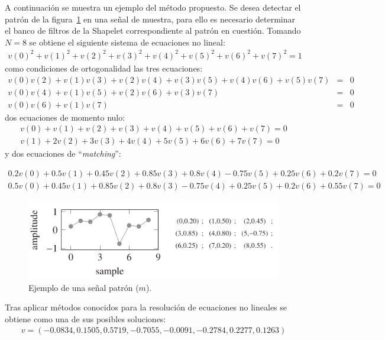 \par A continuaci\'on se muestra un ejemplo del m\'etodo propuesto. Se desea detectar el patr\'on de la figura~\ref{patron-unidimensional} en una se\~nal de muestra, para ello es necesario determinar el banco de filtros de la Shapelet correspondiente al patr\'on en cuesti\'on. Tomando $N=8$ se obtiene el siguiente sistema de ecuaciones no lineal:
\begin{eqnarray}
v(0)^2+v(1)^2+v(2)^2+v(3)^2+v(4)^2+v(5)^2+v(6)^2+v(7)^2=1\nonumber
\end{eqnarray}
como condiciones de ortogonalidad las tres ecuaciones:
\begin{eqnarray}
v(0)v(2)+v(1)v(3)+v(2)v(4)+v(3)v(5)+v(4)v(6)+v(5)v(7)&=&0\nonumber\\
v(0)v(4)+v(1)v(5)+v(2)v(6)+v(3)v(7)&=&0\nonumber\\
v(0)v(6)+v(1)v(7)&=&0\nonumber
\end{eqnarray}
dos ecuaciones de momento nulo:
\begin{eqnarray}
v(0)+v(1)+v(2)+v(3)+v(4)+v(5)+v(6)+v(7)=0\nonumber\\
v(1)+2v(2)+3v(3)+4v(4)+5v(5)+6v(6)+7v(7)=0\nonumber
\end{eqnarray}
y dos ecuaciones de ``\textit{matching}'':
\begin{small}
\begin{eqnarray}
0.2v(0)+0.5v(1)+0.45v(2)+0.85v(3)+0.8v(4)-0.75v(5)+0.25v(6)+0.2v(7)=0\nonumber\\
0.5v(0)+0.45v(1)+0.85v(2)+0.8v(3)-0.75v(4)+0.25v(5)+0.2v(6)+0.55v(7)=0\nonumber
\end{eqnarray}
\end{small}

\begin{figure}[h]
\center
\includegraphics[scale=.5]{Graphics/Patron.png}
\caption{Ejemplo de una se\~nal patr\'on ($m$).}
\label{patron-unidimensional}
\end{figure}

\par Tras aplicar m\'etodos conocidos para la resoluci\'on de ecuaciones no lineales se obtiene como una de sus posibles soluciones:
\begin{eqnarray}
v = (-0.0834,0.1505,0.5719,-0.7055,-0.0091,-0.2784,0.2277,0.1263)\nonumber
\end{eqnarray}

